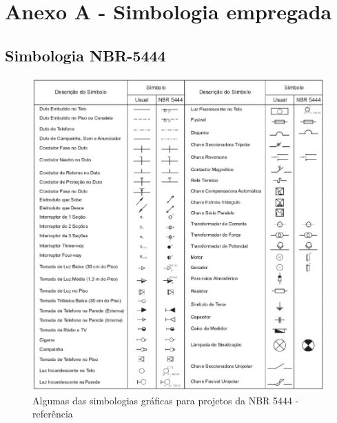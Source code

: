 \section{Anexo A - Simbologia empregada} \label{section: anexo A simbologia}

\subsection{Simbologia NBR-5444}\label{subsection: simbologia NBR5444}
	\begin{figure}[H]
		\centering
		\includegraphics[width=\textwidth]{Figures/5. Symbology/NBR 5444.png}
		\caption{Algumas das simbologias gráficas para projetos da NBR 5444 - referência \cite{filho2017instalacoes}}
		\label{fig: simbologia nbr5444}
	\end{figure}

\newpage

